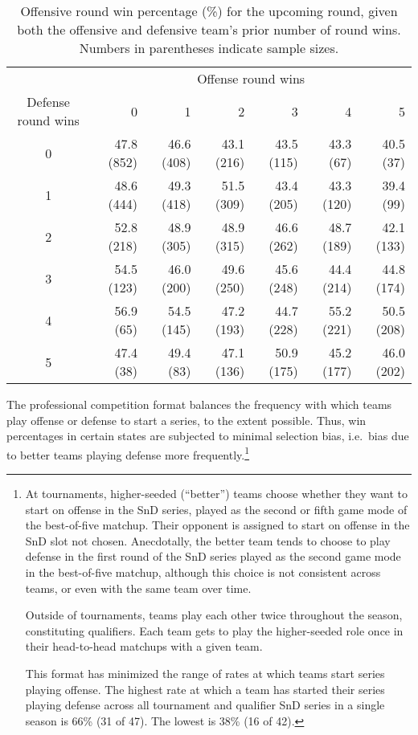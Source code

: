 \documentclass{article}
\begin{document}
\begin{table}

\caption{Offensive round win percentage (\%) for the upcoming round, given both the offensive and defensive team's prior number of round wins. Numbers in parentheses indicate sample sizes.}

\centering
\begin{tabular}{crrrrrr}
\toprule
& \multicolumn{6}{c}{Offense round wins} \\ 
\cmidrule(lr){2-7}
Defense round wins & 0 & 1 & 2 & 3 & 4 & 5 \\ 
\midrule

0 & 47.8 (852) & 46.6 (408) & 43.1 (216) & 43.5 (115) & 43.3 (67)  & 40.5 (37)  \\
1 & 48.6 (444) & 49.3 (418) & 51.5 (309) & 43.4 (205) & 43.3 (120) & 39.4 (99)  \\
2 & 52.8 (218) & 48.9 (305) & 48.9 (315) & 46.6 (262) & 48.7 (189) & 42.1 (133) \\
3 & 54.5 (123) & 46.0 (200) & 49.6 (250) & 45.6 (248) & 44.4 (214) & 44.8 (174) \\
4 & 56.9 (65)  & 54.5 (145) & 47.2 (193) & 44.7 (228) & 55.2 (221) & 50.5 (208) \\
5 & 47.4 (38)  & 49.4 (83)  & 47.1 (136) & 50.9 (175) & 45.2 (177) & 46.0 (202) \\

\bottomrule
\end{tabular}

\label{tbl:o-win-prop-by-series-state}

\end{table}

The professional competition format balances the frequency with which
teams play offense or defense to start a series, to the extent possible.
Thus, win percentages in certain states are subjected to minimal
selection bias, i.e.~bias due to better teams playing defense more
frequently.\footnote{At tournaments, higher-seeded (``better'') teams
  choose whether they want to start on offense in the SnD series, played
  as the second or fifth game mode of the best-of-five matchup. Their
  opponent is assigned to start on offense in the SnD slot not chosen.
  Anecdotally, the better team tends to choose to play defense in the
  first round of the SnD series played as the second game mode in the
  best-of-five matchup, although this choice is not consistent across
  teams, or even with the same team over time.

  Outside of tournaments, teams play each other twice throughout the
  season, constituting qualifiers. Each team gets to play the
  higher-seeded role once in their head-to-head matchups with a given
  team.

  This format has minimized the range of rates at which teams start
  series playing offense. The highest rate at which a team has started
  their series playing defense across all tournament and qualifier SnD
  series in a single season is 66\% (31 of 47). The lowest is 38\% (16
  of 42).}
\end{document}
